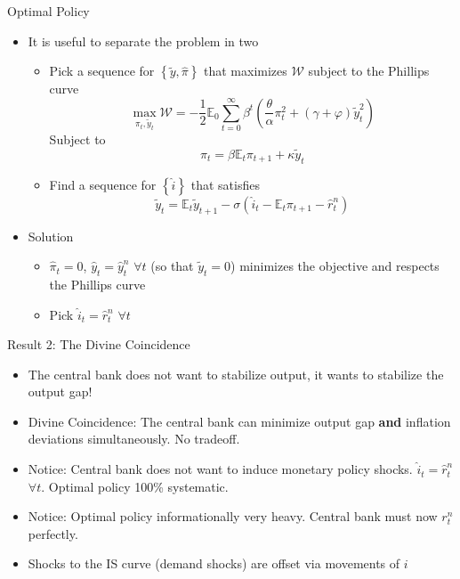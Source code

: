 \documentclass[11pt,aspectratio=169,xcolor={dvipsnames},hyperref={pdftex,pdfpagemode=UseNone,hidelinks,pdfdisplaydoctitle=true},usepdftitle=false]{beamer}
\begin{document}
\begin{frame}{Optimal Policy}
\begin{itemize}
\item It is useful to separate the problem in two
\begin{itemize}
\item Pick a sequence for  $\left\lbrace  \tilde{y}, \hat{\pi}\right\rbrace$ that maximizes $\mathcal{W}$ subject to the Phillips curve
$$\max_{\pi_t, \tilde{y}_t}\mathcal{W} = -\frac{1}{2 }\mathbb{E}_0 \sum_{t=0}^{\infty} \beta^t \left(\frac{\theta}{\alpha}\pi^2_t + (\gamma + \varphi) \tilde{y}^2_t \right)$$
Subject to 
$$\pi_t = \beta \mathbb{E}_t \pi_{t+1} + \kappa \tilde{y}_t$$
\item Find a sequence for  $\left\lbrace \hat{i}\right\rbrace$ that satisfies 
$$\tilde{y}_t = \mathbb{E}_t \tilde{y}_{t+1} - \sigma(\hat{i}_t - \mathbb{E}_t \pi_{t+1} - \hat{r}^n_t)$$
\end{itemize}
\item Solution
\begin{itemize}
\item $\hat{\pi}_t = 0$, $\hat{y}_t = \hat{y}^n_t$ $\forall t$ (so that $\tilde{y}_t = 0$) minimizes the objective and respects the Phillips curve
\item Pick $\hat{i}_t = \hat{r}^n_t$ $\forall t$
\end{itemize}
\end{itemize}
\end{frame}


\begin{frame}{Result 2: The Divine Coincidence}
\begin{itemize}
\item The central bank does not want to stabilize output, it wants to stabilize the output gap!
\item Divine Coincidence: The central bank can minimize output gap \textbf{and} inflation deviations simultaneously. No tradeoff.
\item Notice: Central bank does not want to induce monetary policy shocks. $\hat{i}_t = \hat{r}^n_t$ $\forall t$. Optimal policy 100\% systematic.
\item Notice: Optimal policy informationally very heavy. Central bank must now $r^n_t$ perfectly.
\item Shocks to the IS curve (demand shocks) are offset via movements of $i$
\end{itemize}
\end{frame}
\end{document}

